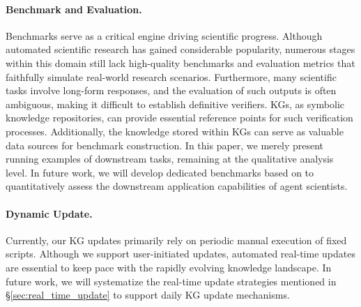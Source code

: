 \paragraph{Benchmark and Evaluation.}
Benchmarks serve as a critical engine driving scientific progress.
Although automated scientific research has gained considerable popularity, numerous stages within this domain still lack high-quality benchmarks and evaluation metrics that faithfully simulate real-world research scenarios.
Furthermore, many scientific tasks involve long-form responses, and the evaluation of such outputs is often ambiguous, making it difficult to establish definitive verifiers.
KGs, as symbolic knowledge repositories, can provide essential reference points for such verification processes.
Additionally, the knowledge stored within KGs can serve as valuable data sources for benchmark construction.
In this paper, we merely present running examples of downstream tasks, remaining at the qualitative analysis level.
In future work, we will develop dedicated benchmarks based on {\ours} to quantitatively assess the downstream application capabilities of agent scientists.

\paragraph{Dynamic Update.}
Currently, our KG updates primarily rely on periodic manual execution of fixed scripts.
Although we support user-initiated updates, automated real-time updates are essential to keep pace with the rapidly evolving knowledge landscape.
In future work, we will systematize the real-time update strategies mentioned in \S\ref{sec:real_time_update} to support daily KG update mechanisms.
